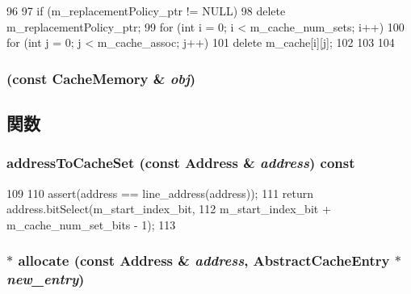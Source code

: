 \begin{DoxyCode}
96 {
97     if (m_replacementPolicy_ptr != NULL)
98         delete m_replacementPolicy_ptr;
99     for (int i = 0; i < m_cache_num_sets; i++) {
100         for (int j = 0; j < m_cache_assoc; j++) {
101             delete m_cache[i][j];
102         }
103     }
104 }
\end{DoxyCode}
\hypertarget{classCacheMemory_a15c87d4f0ba579b954e84d6eee946d46}{
\subsubsection[{CacheMemory}]{ (const {\bf CacheMemory} \& {\em obj})}}
\label{classCacheMemory_a15c87d4f0ba579b954e84d6eee946d46}


\subsection{関数}
\hypertarget{classCacheMemory_ab8af076beefca7ea17d6ffbf639456db}{
\subsubsection[{addressToCacheSet}]{ addressToCacheSet (const {\bf Address} \& {\em address}) const}}
\label{classCacheMemory_ab8af076beefca7ea17d6ffbf639456db}



\begin{DoxyCode}
109 {
110     assert(address == line_address(address));
111     return address.bitSelect(m_start_index_bit,
112                              m_start_index_bit + m_cache_num_set_bits - 1);
113 }
\end{DoxyCode}
\hypertarget{classCacheMemory_a3318e163b565401bb192c21040097d88}{
\subsubsection[{allocate}]{ $\ast$ allocate (const {\bf Address} \& {\em address}, \/  {\bf AbstractCacheEntry} $\ast$ {\em new\_\-entry})}}
\label{classCacheMemory_a3318e163b565401bb192c21040097d88}



